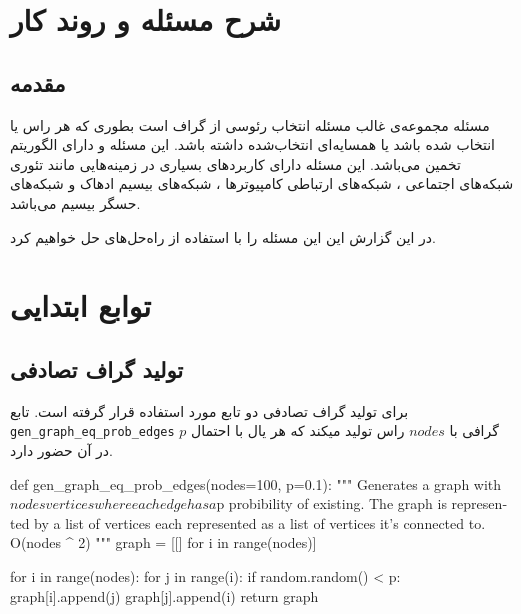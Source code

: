 \chapter{شرح مسئله و روند کار}

\section{مقدمه}
مسئله مجموعه‌ی غالب مسئله انتخاب رئوسی از گراف است بطوری که هر راس یا انتخاب شده باشد یا همسایه‌ای انتخاب‌شده داشته باشد. این مسئله
و دارای  الگوریتم تخمین می‌باشد.
این مسئله دارای کاربردهای بسیاری در زمینه‌هایی
 مانند تئوری شبکه‌های اجتماعی
 ، شبکه‌های ارتباطی کامپیوتر‌ها
 ، شبکه‌های بیسیم ادهاک
  و شبکه‌های حسگر بیسیم
می‌باشد.
\cite{sasireka2014applications}

در این گزارش این این مسئله را با استفاده از راه‌حل‌های 
حل خواهیم کرد.

\chapter{توابع ابتدایی}
\section{تولید گراف تصادفی}
برای تولید گراف تصادفی دو تابع مورد استفاده قرار گرفته است.
تابع
\verb;gen_graph_eq_prob_edges;
گرافی با
$nodes$
راس تولید میکند که هر یال با احتمال
$p$
در آن حضور دارد.
\begin{latin}
\begin{python}
def gen_graph_eq_prob_edges(nodes=100, p=0.1):
    """
    Generates a graph with $nodes vertices where each edge has a $p probibility of existing. 
    The graph is represented by a list of vertices each represented as a list of vertices it's connected to.
    O(nodes ^ 2)
    """
    graph = [[] for i in range(nodes)]

    for i in range(nodes):
        for j in range(i):
            if random.random() < p:
                graph[i].append(j)
                graph[j].append(i)
    return graph

\end{python}
\end{latin}

